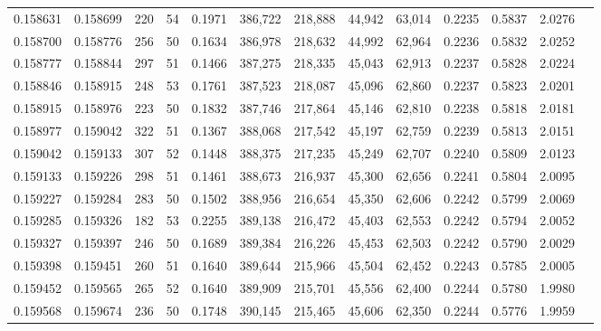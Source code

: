 \begin{tabular}{rrrrrrrrrrrrr}
0.158631 & 0.158699 &   220 &  54 &                                     0.1971 & 386,722 & 218,888 &  44,942 &  63,014 & 0.2235 & 0.5837 & 2.0276 \\
0.158700 & 0.158776 &   256 &  50 &                                     0.1634 & 386,978 & 218,632 &  44,992 &  62,964 & 0.2236 & 0.5832 & 2.0252 \\
0.158777 & 0.158844 &   297 &  51 &                                     0.1466 & 387,275 & 218,335 &  45,043 &  62,913 & 0.2237 & 0.5828 & 2.0224 \\
0.158846 & 0.158915 &   248 &  53 &                                     0.1761 & 387,523 & 218,087 &  45,096 &  62,860 & 0.2237 & 0.5823 & 2.0201 \\
0.158915 & 0.158976 &   223 &  50 &                                     0.1832 & 387,746 & 217,864 &  45,146 &  62,810 & 0.2238 & 0.5818 & 2.0181 \\
0.158977 & 0.159042 &   322 &  51 &                                     0.1367 & 388,068 & 217,542 &  45,197 &  62,759 & 0.2239 & 0.5813 & 2.0151 \\
0.159042 & 0.159133 &   307 &  52 &                                     0.1448 & 388,375 & 217,235 &  45,249 &  62,707 & 0.2240 & 0.5809 & 2.0123 \\
0.159133 & 0.159226 &   298 &  51 &                                     0.1461 & 388,673 & 216,937 &  45,300 &  62,656 & 0.2241 & 0.5804 & 2.0095 \\
0.159227 & 0.159284 &   283 &  50 &                                     0.1502 & 388,956 & 216,654 &  45,350 &  62,606 & 0.2242 & 0.5799 & 2.0069 \\
0.159285 & 0.159326 &   182 &  53 &                                     0.2255 & 389,138 & 216,472 &  45,403 &  62,553 & 0.2242 & 0.5794 & 2.0052 \\
0.159327 & 0.159397 &   246 &  50 &                                     0.1689 & 389,384 & 216,226 &  45,453 &  62,503 & 0.2242 & 0.5790 & 2.0029 \\
0.159398 & 0.159451 &   260 &  51 &                                     0.1640 & 389,644 & 215,966 &  45,504 &  62,452 & 0.2243 & 0.5785 & 2.0005 \\
0.159452 & 0.159565 &   265 &  52 &                                     0.1640 & 389,909 & 215,701 &  45,556 &  62,400 & 0.2244 & 0.5780 & 1.9980 \\
0.159568 & 0.159674 &   236 &  50 &                                     0.1748 & 390,145 & 215,465 &  45,606 &  62,350 & 0.2244 & 0.5776 & 1.9959 \\

\end{tabular}
